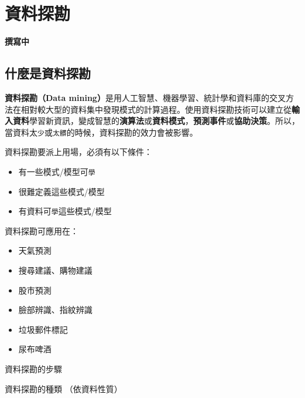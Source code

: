 \documentclass[]{book}
\providecommand{\tightlist}{%
  \setlength{\itemsep}{0pt}\setlength{\parskip}{0pt}}
\begin{document}
\chapter{資料探勘}\label{datamining}

\textbf{撰寫中}

\section{什麼是資料探勘}

\textbf{資料探勘（Data
mining）}是用人工智慧、機器學習、統計學和資料庫的交叉方法在相對較大型的資料集中發現模式的計算過程。使用資料探勘技術可以建立從\textbf{輸入資料}學習新資訊，變成智慧的\textbf{演算法}或\textbf{資料模式}，\textbf{預測事件}或\textbf{協助決策}。所以，當資料太\texttt{少}或\texttt{太髒}的時候，資料探勘的效力會被影響。

資料探勘要派上用場，必須有以下條件：

\begin{itemize}
\tightlist
\item
  有一些模式/模型可\texttt{學}
\item
  很難定義這些模式/模型
\item
  有資料可\texttt{學}這些模式/模型
\end{itemize}

資料探勘可應用在：

\begin{itemize}
\tightlist
\item
  天氣預測
\item
  搜尋建議、購物建議
\item
  股市預測
\item
  臉部辨識、指紋辨識
\item
  垃圾郵件標記
\item
  尿布啤酒
\end{itemize}

資料探勘的步驟

資料探勘的種類 （依資料性質）
\end{document}

